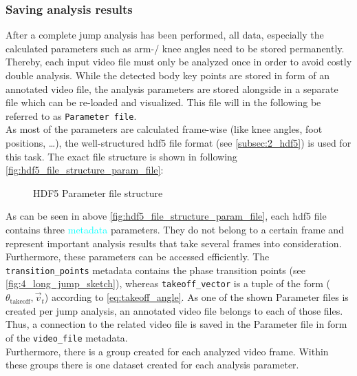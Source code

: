 \subsubsection*{Saving analysis results}
After a complete jump analysis has been performed, all data, especially
the calculated parameters such as arm-/ knee angles need to be stored
permanently.
Thereby, each input video file must only be analyzed once in order to avoid
costly double analysis.
While the detected body key points are stored in form of an annotated video
file, the analysis parameters are stored alongside in a separate file which
can be re-loaded and visualized.
This file will in the following be referred to as \texttt{Parameter file}.\\
As most of the parameters are calculated frame-wise (like knee angles, foot
positions, \dots), the well-structured hdf5 file format (see
\autoref{subsec:2_hdf5}) is used for this task.
The exact file structure is shown in following 
\autoref{fig:hdf5_file_structure_param_file}:
\begin{figure}[h!]
    \centering
    \begin{minipage}{0.5\textwidth}
    \end{minipage}
    \caption[HDF5 Parameter file structure]{HDF5 Parameter file structure}
    \label{fig:hdf5_file_structure_param_file}
\end{figure}
\FloatBarrier
\noindent As can be seen in above \autoref{fig:hdf5_file_structure_param_file},
each hdf5 file contains three \textcolor{cyan}{metadata} parameters.
They do not belong to a certain frame and represent important analysis results
that take several frames into consideration.
Furthermore, these parameters can be accessed efficiently.
The \texttt{transition\_points} metadata contains the phase transition points
(see \autoref{fig:4_long_jump_sketch}), whereas \texttt{takeoff\_vector} is a
tuple of the form ($\theta_{\text{takeoff}}, \vec{{}v}_t$) according to
\autoref{eq:takeoff_angle}.
As one of the shown Parameter files is created per jump analysis, an annotated
video file belongs to each of those files.
Thus, a connection to the related video file is saved in the
Parameter file in form of the \texttt{video\_file} metadata.\\
Furthermore, there is a group created for each analyzed video frame.
Within these groups there is one dataset created for each analysis parameter.\\

